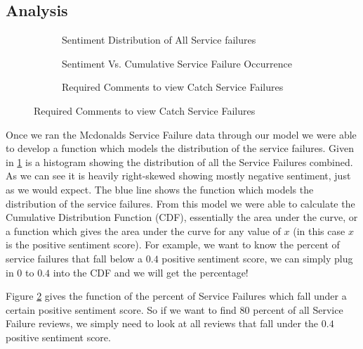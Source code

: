 \documentclass[titlepage,letterpaper]{article}
\begin{document}




\subsection{Analysis}


\begin{figure}[]
		\vspace*{-1.25in}
		\begin{adjustwidth*}{-1in}{-1in}
\begin{subfigure}{16cm}
\caption{Sentiment Distribution of All Service failures}
\label{all}

\end{subfigure}
\begin{subfigure}{16cm}
		\centering
		\caption{Sentiment Vs. Cumulative Service Failure Occurrence}
		\label{sentivfail}
		
\end{subfigure}
\begin{subfigure}{16cm}
		\centering
		\caption{Required Comments to view Catch  Service Failures}
		\label{sentichick}
		
\end{subfigure}
	\end{adjustwidth*}
\end{figure}


Once we ran the Mcdonalds Service Failure data through our model we were able to develop a function which models the distribution of the service failures. Given in \cref{all} is a histogram showing the distribution of all the Service Failures combined. As we can see it is heavily right-skewed showing mostly negative sentiment, just as we would expect. The blue line shows the function which models the distribution of the service failures. From this model we were able to calculate the Cumulative Distribution Function (CDF), essentially the area under the curve, or a function which gives the area under the curve for any value of $x$ (in this case $x$ is the positive sentiment score). For example, we want to know the percent of service failures that fall below a $0.4$ positive sentiment score, we can simply plug in $0$ to $0.4$ into the CDF and we will get the percentage! 

Figure \ref{sentivfail} gives the function of the percent of Service Failures which fall under a certain positive sentiment score. So if we want to find $80$ percent of all Service Failure reviews, we simply need to look at all reviews that fall under the $0.4$ positive sentiment score. 
\end{document}
